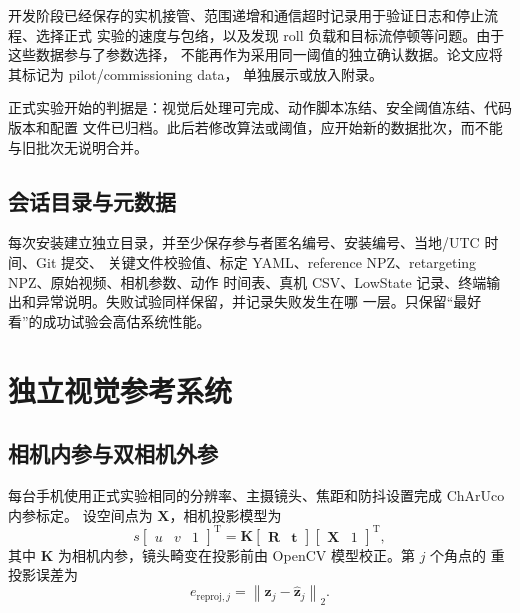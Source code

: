 开发阶段已经保存的实机接管、范围递增和通信超时记录用于验证日志和停止流程、选择正式
实验的速度与包络，以及发现 roll 负载和目标流停顿等问题。由于这些数据参与了参数选择，
不能再作为采用同一阈值的独立确认数据。论文应将其标记为 pilot/commissioning data，
单独展示或放入附录。

正式实验开始的判据是：视觉后处理可完成、动作脚本冻结、安全阈值冻结、代码版本和配置
文件已归档。此后若修改算法或阈值，应开始新的数据批次，而不能与旧批次无说明合并。

\subsection{会话目录与元数据}
\label{subsec:ch6_metadata}

每次安装建立独立目录，并至少保存参与者匿名编号、安装编号、当地/UTC 时间、Git 提交、
关键文件校验值、标定 YAML、reference NPZ、retargeting NPZ、原始视频、相机参数、动作
时间表、真机 CSV、LowState 记录、终端输出和异常说明。失败试验同样保留，并记录失败发生在哪
一层。只保留“最好看”的成功试验会高估系统性能。

\section{独立视觉参考系统}
\label{sec:ch6_visual_reference}

\subsection{相机内参与双相机外参}
\label{subsec:ch6_camera_calibration}

每台手机使用正式实验相同的分辨率、主摄镜头、焦距和防抖设置完成 ChArUco 内参标定。
设空间点为 $\boldsymbol X$，相机投影模型为
\begin{equation}
  s\begin{bmatrix}u&v&1\end{bmatrix}^{\mathrm T}
  =\boldsymbol K
  \begin{bmatrix}\boldsymbol R&\boldsymbol t\end{bmatrix}
  \begin{bmatrix}\boldsymbol X&1\end{bmatrix}^{\mathrm T},
  \label{eq:ch6_camera_projection}
\end{equation}
其中 $\boldsymbol K$ 为相机内参，镜头畸变在投影前由 OpenCV 模型校正。第 $j$ 个角点的
重投影误差为
\begin{equation}
  e_{\mathrm{reproj},j}
  =\left\|\boldsymbol z_j-\hat{\boldsymbol z}_j\right\|_2.
  \label{eq:ch6_reprojection_error}
\end{equation}

